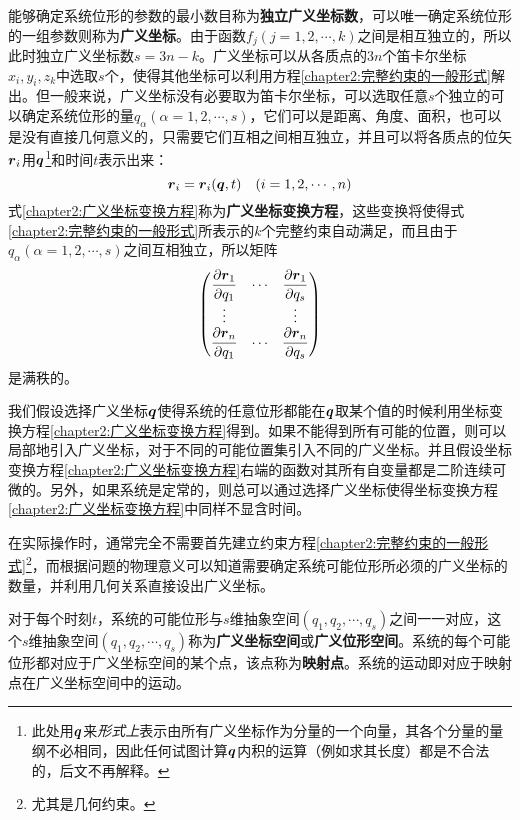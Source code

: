 能够确定系统位形的参数的最小数目称为{\bf 独立广义坐标数}，可以唯一确定系统位形的一组参数则称为{\bf 广义坐标}。由于函数$f_j(j=1,2,\cdots,k)$之间是相互独立的，所以此时独立广义坐标数$s=3n-k$。广义坐标可以从各质点的$3n$个笛卡尔坐标$x_i,y_i,z_k$中选取$s$个，使得其他坐标可以利用方程\eqref{chapter2:完整约束的一般形式}解出。但一般来说，广义坐标没有必要取为笛卡尔坐标，可以选取任意$s$个独立的可以确定系统位形的量$q_\alpha(\alpha=1,2,\cdots,s)$，它们可以是距离、角度、面积，也可以是没有直接几何意义的，只需要它们互相之间相互独立，并且可以将各质点的位矢$\boldsymbol{r}_i$用$\boldsymbol{q}$\footnote{此处用$\boldsymbol{q}$来{\it 形式上}表示由所有广义坐标作为分量的一个向量，其各个分量的量纲不必相同，因此任何试图计算$\boldsymbol{q}$内积的运算（例如求其长度）都是不合法的，后文不再解释。}和时间$t$表示出来：
\begin{equation}
	\boldsymbol{r}_i = \boldsymbol{r}_i(\boldsymbol{q},t)\quad (i=1,2,\cdots,n)
	\label{chapter2:广义坐标变换方程}
\end{equation}
式\eqref{chapter2:广义坐标变换方程}称为{\bf 广义坐标变换方程}，这些变换将使得式\eqref{chapter2:完整约束的一般形式}所表示的$k$个完整约束自动满足，而且由于$q_\alpha(\alpha=1,2,\cdots,s)$之间互相独立，所以矩阵
\begin{equation}
	\begin{pmatrix}
		\dfrac{\partial \boldsymbol{r}_1}{\partial q_1} & \cdots & \dfrac{\partial \boldsymbol{r}_1}{\partial q_s} \\
		\vdots & & \vdots \\
		\dfrac{\partial \boldsymbol{r}_n}{\partial q_1} & \cdots & \dfrac{\partial \boldsymbol{r}_n}{\partial q_s}
	\end{pmatrix}
	\label{chapter2:坐标变换方程的Jacobi矩阵}
\end{equation}
是满秩的。

我们假设选择广义坐标$\boldsymbol{q}$使得系统的任意位形都能在$\boldsymbol{q}$取某个值的时候利用坐标变换方程\eqref{chapter2:广义坐标变换方程}得到。如果不能得到所有可能的位置，则可以局部地引入广义坐标，对于不同的可能位置集引入不同的广义坐标。并且假设坐标变换方程\eqref{chapter2:广义坐标变换方程}右端的函数对其所有自变量都是二阶连续可微的。另外，如果系统是定常的，则总可以通过选择广义坐标使得坐标变换方程\eqref{chapter2:广义坐标变换方程}中同样不显含时间。

在实际操作时，通常完全不需要首先建立约束方程\eqref{chapter2:完整约束的一般形式}\footnote{尤其是几何约束。}，而根据问题的物理意义可以知道需要确定系统可能位形所必须的广义坐标的数量，并利用几何关系直接设出广义坐标。

对于每个时刻$t$，系统的可能位形与$s$维抽象空间$(q_1,q_2,\cdots,q_s)$之间一一对应，这个$s$维抽象空间$(q_1,q_2,\cdots,q_s)$称为{\bf 广义坐标空间}或{\bf 广义位形空间}。系统的每个可能位形都对应于广义坐标空间的某个点，该点称为{\bf 映射点}。系统的运动即对应于映射点在广义坐标空间中的运动。

